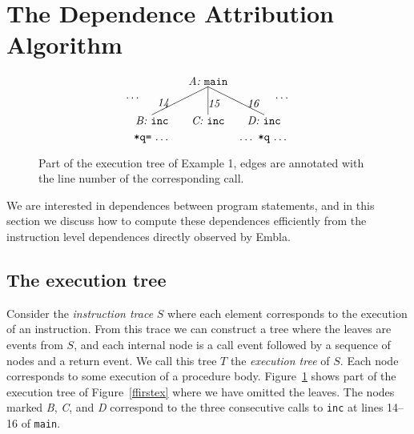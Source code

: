 \documentclass[times, 10pt,twocolumn]{article}
\begin{document}


\section{The Dependence Attribution Algorithm}

\begin{figure} \small
\hrulefill
\[
\begin{picture}(160,60)(70,15)
\put(120,65){\makebox(60,10)[c]{\it A:\ \tt main}}
\put(150,65){\line(-2,-1){50}}
\put(150,65){\line( 0,-1){25}}
\put(150,65){\line( 2,-1){50}}
\put(95,45){\makebox(20,10)[r]{\it 14}}
\put(150,45){\makebox(20,10)[l]{\it 15}}
\put(185,45){\makebox(20,10)[l]{\it 16}}
\put(70,50){\makebox(20,10)[r]{\ldots}}
\put(210,50){\makebox(20,10)[l]{\ldots}}
\put(170,30){\makebox(60,10)[c]{\it D:\ \tt inc}}
\put(120,30){\makebox(60,10)[c]{\it C:\ \tt inc}}
\put(70,30){\makebox(60,10)[c]{\it B:\ \tt inc}}
\put(70,15){\makebox(60,10)[cb]{{\tt *q=}\ \ldots}}
\put(170,15){\makebox(60,10)[cb]{\ldots\ {\tt *q}\ \ldots}}
\end{picture}
\]
\hrulefill
\caption{Part of the execution tree of Example 1, edges are annotated 
with the line number of the corresponding call.} 
\label{ffextree}
\end{figure}

We are interested in dependences between program statements, and in 
this section we discuss how to compute these dependences efficiently from
the instruction level dependences directly observed by Embla.

\subsection{The execution tree}

Consider the {\em instruction trace} $S$ where each element corresponds 
to the execution of an instruction. From this trace we can construct a 
tree where the leaves are events from $S$, and each 
internal node is a call
event followed by a sequence of nodes and a return event. We call
this tree $T$ the {\em execution tree} of $S$. 
Each node corresponds to some execution of a procedure body.
Figure~\ref{ffextree} shows part of
the execution tree of Figure~\ref{ffirstex} where we have omitted the 
leaves. The nodes marked {\it B}, {\it C}, and {\it D} correspond to 
the three consecutive calls to {\tt inc} at lines 14--16 of {\tt main}.
\end{document}
